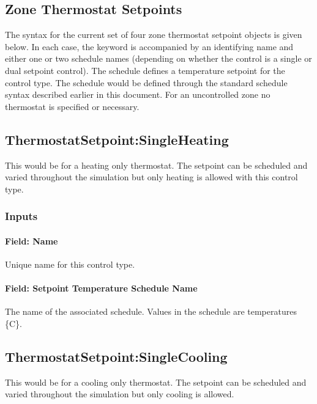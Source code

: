 \subsection{Zone Thermostat Setpoints}\label{zone-thermostat-setpoints}

The syntax for the current set of four zone thermostat setpoint objects is given below. In each case, the keyword is accompanied by an identifying name and either one or two schedule names (depending on whether the control is a single or dual setpoint control). The schedule defines a temperature setpoint for the control type. The schedule would be defined through the standard schedule syntax described earlier in this document. For an uncontrolled zone no thermostat is specified or necessary.

\subsection{ThermostatSetpoint:SingleHeating}\label{thermostatsetpointsingleheating}

This would be for a heating only thermostat. The setpoint can be scheduled and varied throughout the simulation but only heating is allowed with this control type.

\subsubsection{Inputs}\label{inputs-1-051}

\paragraph{Field: Name}\label{field-name-1-049}

Unique name for this control type.

\paragraph{Field: Setpoint Temperature Schedule Name}\label{field-setpoint-temperature-schedule-name-002}

The name of the associated schedule. Values in the schedule are temperatures \{C\}.

\subsection{ThermostatSetpoint:SingleCooling}\label{thermostatsetpointsinglecooling}

This would be for a cooling only thermostat. The setpoint can be scheduled and varied throughout the simulation but only cooling is allowed.

